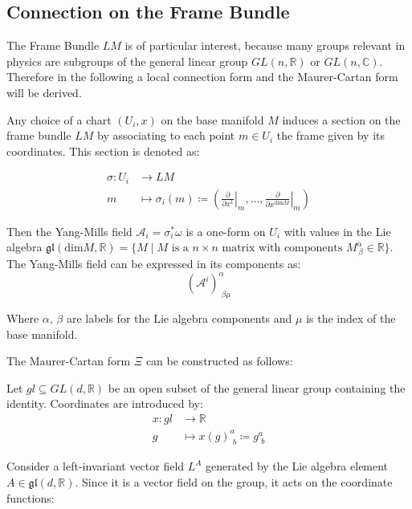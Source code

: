 \subsection{Connection on the Frame Bundle}

The Frame Bundle $LM$ is of particular interest, because many groups relevant in physics are subgroups of the general linear group \( GL(n, \mathbb{R}) \) or \( GL(n, \mathbb{C}) \). Therefore in the following a local connection form and the Maurer-Cartan form will be derived.

Any choice of a chart \( (U_i, x) \) on the base manifold \( M \) induces a section on the frame bundle \( LM \) by associating to each point \( m \in U_i \) the frame given by its coordinates. This section is denoted as:

\begin{align*}
  \sigma : U_i &\longrightarrow LM \\
  m &\mapsto \sigma_i(m) \coloneq \left( \left. \frac{\partial}{\partial x^1} \right|_m, \dots , \left. \frac{\partial}{\partial x^{\text{dim}M}} \right|_m  \right)
\end{align*}



Then the Yang-Mills field \( \mathcal{A}_i = \sigma_i^* \omega \) is a one-form on \( U_i \) with values in the Lie algebra $\mathfrak{gl}(\text{dim}M,\mathbb{R}) = \{ M \mid M \text{ is a } n\times n \text{ matrix with components } M^\alpha_{\,\beta}\in \mathbb{R} \}$. The Yang-Mills field can be expressed in its components as:
\[ (\mathcal{A}^i)^\alpha_{\,\,\beta\mu} \]

Where $\alpha, \,  \beta$ are labels for the Lie algebra components and $\mu$ is the index of the base manifold. 

The Maurer-Cartan form \( \Xi \) can be constructed as follows:

Let \( gl \subseteq GL(d,\mathbb{R}) \) be an open subset of the general linear group containing the identity. Coordinates are introduced by:
\begin{align*}
  x: gl &\longrightarrow \mathbb{R} \\
  g &\mapsto x(g)^a_{\,\,b} \coloneq g^a_{\,\,b}
\end{align*}

Consider a left-invariant vector field \( L^A \) generated by the Lie algebra element \( A \in \mathfrak{gl}(d, \mathbb{R}) \). Since it is a vector field on the group, it acts on the coordinate functions:

